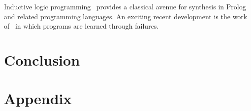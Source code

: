 \documentclass[acmsmall]{acmart}
\theoremstyle{mytheoremstyle}
\begin{document}
Inductive logic programming~\cite{ilp} provides a classical avenue for synthesis in Prolog and related programming languages. An exciting recent development is the work of~\citet{cropper} in which programs are learned through failures.


\section{Conclusion}






\newpage
\section{Appendix}
\end{document}
